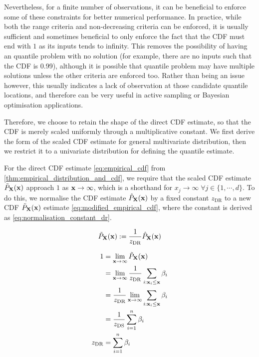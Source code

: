 \documentclass[twoside]{article} \usepackage{aistats2017}
\theoremstyle{definition}
\theoremstyle{theorem}
\newcommand{\rv}[1]{{#1}}
\begin{document}
		Nevertheless, for a finite number of observations, it can be beneficial to enforce some of these constraints for better numerical performance. In practice, while both the range criteria and non-decreasing criteria can be enforced, it is usually sufficient and sometimes beneficial to only enforce the fact that the CDF must end with $1$ as its inputs tends to infinity. This removes the possibility of having an quantile problem with no solution (for example, there are no inputs such that the CDF is 0.99), although it is possible that quantile problem may have multiple solutions unless the other criteria are enforced too. Rather than being an issue however, this usually indicates a lack of observation at those candidate quantile locations, and therefore can be very useful in active sampling or Bayesian optimisation applications.
		
		Therefore, we choose to retain the shape of the direct CDF estimate, so that the CDF is merely scaled uniformly through a multiplicative constant. We first derive the form of the scaled CDF estimate for general multivariate distribution, then we restrict it to a univariate distribution for defining the quantile estimate.
		
		For the direct CDF estimate \eqref{eq:empirical_cdf} from \cref{thm:empirical_distribution_and_cdf}, we require that the scaled CDF estimate $\tilde{P}_{\bvec{\rv{X}}}(\bvec{x})$ approach $1$ as $\mathbf{x} \to \infty $, which is a shorthand for $x_{j} \to \infty \; \forall j \in \{1, \cdots, d\}$. To do this, we normalise the CDF estimate $\hat{P}_{\bvec{\rv{X}}}(\bvec{x})$ by a fixed constant $z_{\mathrm{DR}}$ to a new CDF $\tilde{P}_{\bvec{\rv{X}}}(\bvec{x})$ estimate \eqref{eq:modified_empirical_cdf}, where the constant is derived as \eqref{eq:normalisation_constant_dr}.
		
		\begin{equation}
			\tilde{P}_{\bvec{\rv{X}}}(\bvec{x}) := \frac{1}{z_{\mathrm{DR}}} \hat{P}_{\bvec{\rv{X}}}(\bvec{x})
		\label{eq:modified_empirical_cdf}
		\end{equation}
		
		\begin{equation}
			\begin{aligned}
				1 &= \lim_{\bvec{x} \to \infty} \tilde{P}_{\bvec{\rv{X}}}(\bvec{x}) \\
				&= \lim_{\bvec{x} \to \infty} \frac{1}{z_{\mathrm{DR}}} \sum_{i : \bvec{x}_{i} \leq \bvec{x}} \beta_{i} \\
				&= \frac{1}{z_{\mathrm{DR}}} \lim_{\bvec{x} \to \infty} \sum_{i : \bvec{x}_{i} \leq \bvec{x}} \beta_{i} \\
				&= \frac{1}{z_{\mathrm{DS}}} \sum_{i = 1}^{n} \beta_{i} \\
				z_{\mathrm{DR}} &= \sum_{i = 1}^{n} \beta_{i}
			\end{aligned}
		\label{eq:normalisation_constant_dr}
		\end{equation}
		
\end{document}
